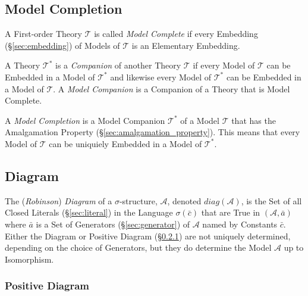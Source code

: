\subsection{Model Completion}\label{sec:model_completion}

A First-order Theory $\mathcal{T}$ is called \emph{Model Complete} if
every Embedding (\S\ref{sec:embedding}) of Models of $\mathcal{T}$ is
an Elementary Embedding.

A Theory $\mathcal{T}^*$ is a \emph{Companion} of another Theory
$\mathcal{T}$ if every Model of $\mathcal{T}$ can be Embedded in a
Model of $\mathcal{T}^*$ and likewise every Model of $\mathcal{T}^*$
can be Embedded in a Model of $\mathcal{T}$. A \emph{Model Companion}
is a Companion of a Theory that is Model Complete.

A \emph{Model Completion} is a Model Companion $\mathcal{T}^*$ of a
Model $\mathcal{T}$ that has the Amalgamation Property
(\S\ref{sec:amalgamation_property}). This means that every Model of
$\mathcal{T}$ can be uniquiely Embedded in a Model of $\mathcal{T}^*$.



\subsection{Diagram}\label{sec:diagram}

The (\emph{Robinson}) \emph{Diagram} of a $\sigma$-structure,
$\mathcal{A}$, denoted $diag(\mathcal{A})$, is the Set of all Closed
Literals (\S\ref{sec:literal}) in the Language $\sigma(\bar{c})$ that
are True in $(\mathcal{A}, \bar{a})$ where $\bar{a}$ is a Set of
Generators (\S\ref{sec:generator}) of $\mathcal{A}$ named by Constants
$\bar{c}$. Either the Diagram or Positive Diagram
(\S\ref{sec:positive_diagram}) are not uniquely determined, depending
on the choice of Generators, but they do determine the Model
$\mathcal{A}$ up to Isomorphism.



\subsubsection{Positive Diagram}\label{sec:positive_diagram}


